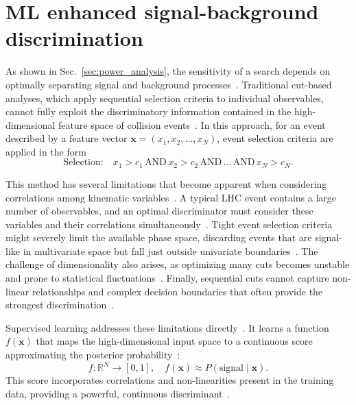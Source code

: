 \section{ML enhanced signal-background discrimination}
\label{sec:machine_learning}

As shown in Sec.~\ref{sec:power_analysis}, the sensitivity of a search depends on optimally separating signal and background processes~\cite{Cowan:2011,Guest2018}. Traditional cut-based analyses, which apply sequential selection criteria to individual observables, cannot fully exploit the discriminatory information contained in the high-dimensional feature space of collision events~\cite{Hastie2009,Guest2018}. In this approach, for an event described by a feature vector $\mathbf{x} = (x_1, x_2, \ldots, x_N)$, event selection criteria are applied in the form~\cite{Hoecker2007}
\begin{equation}
\text{Selection:} \quad x_1 > c_1 \,\text{AND}\, x_2 > c_2 \,\text{AND}\, \ldots \,\text{AND}\, x_N > c_N.
\end{equation}

This method has several limitations that become apparent when considering correlations among kinematic variables~\cite{Hastie2009,Guest2018}. A typical LHC event contains a large number of observables, and an optimal discriminator must consider these variables and their correlations simultaneously~\cite{Hoecker2007,pedregosa_scikit-learn_2011}. Tight event selection criteria might severely limit the available phase space, discarding events that are signal-like in multivariate space but fall just outside univariate boundaries~\cite{Hastie2009,Guest2018}. The challenge of dimensionality also arises, as optimizing many cuts becomes unstable and prone to statistical fluctuations~\cite{Hastie2009,friedman_greedy_2001}. Finally, sequential cuts cannot capture non-linear relationships and complex decision boundaries that often provide the strongest discrimination~\cite{Hastie2009,Guest2018}.

Supervised learning addresses these limitations directly~\cite{Hastie2009,Guest2018}. It learns a function $f(\mathbf{x})$ that maps the high-dimensional input space to a continuous score approximating the posterior probability~\cite{Cranmer2015,Platt1999}:
\begin{equation}
f: \mathbb{R}^N \rightarrow [0,1], \quad f(\mathbf{x}) \approx P(\text{signal} \mid \mathbf{x}).
\end{equation}
This score incorporates correlations and non-linearities present in the training data, providing a powerful, continuous discriminant~\cite{Hastie2009,Guest2018}.

